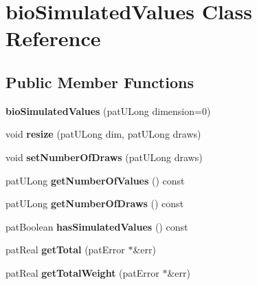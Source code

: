 \hypertarget{classbio_simulated_values}{}\section{bio\+Simulated\+Values Class Reference}
\label{classbio_simulated_values}
\subsection*{Public Member Functions}
\begin{DoxyCompactItemize}
\item 
\mbox{\label{classbio_simulated_values_a93f67cc6eebbba00cb494909d762f279}} 
{\bfseries bio\+Simulated\+Values} (pat\+U\+Long dimension=0)
\item 
\mbox{\label{classbio_simulated_values_ac753ec02c5836973c12d0bcd99a71921}} 
void {\bfseries resize} (pat\+U\+Long dim, pat\+U\+Long draws)
\item 
\mbox{\label{classbio_simulated_values_ae666b777d12661e17ae5de2c7601f0e7}} 
void {\bfseries set\+Number\+Of\+Draws} (pat\+U\+Long draws)
\item 
\mbox{\label{classbio_simulated_values_a261344e3ebd1b2dfb56461adb8fe1287}} 
pat\+U\+Long {\bfseries get\+Number\+Of\+Values} () const
\item 
\mbox{\label{classbio_simulated_values_a612cfa6453dc70c630006e7db842d2a0}} 
pat\+U\+Long {\bfseries get\+Number\+Of\+Draws} () const
\item 
\mbox{\label{classbio_simulated_values_a80649e8e4c557ce43be78a715b7b8903}} 
pat\+Boolean {\bfseries has\+Simulated\+Values} () const
\item 
\mbox{\label{classbio_simulated_values_a86ba7c8ae425b4d1eb4fdd4897c9f1c7}} 
pat\+Real {\bfseries get\+Total} (pat\+Error $\ast$\&err)
\item 
\mbox{\label{classbio_simulated_values_a9ee10c8b42ab622828a6d3fc42ef96f1}} 
pat\+Real {\bfseries get\+Total\+Weight} (pat\+Error $\ast$\&err)

\end{DoxyCompactItemize}
